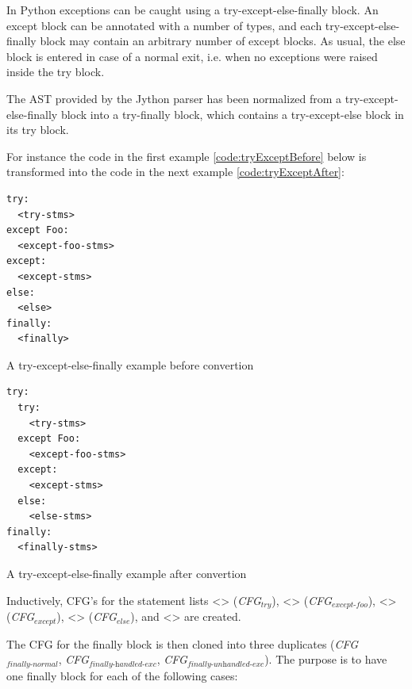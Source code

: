 In Python exceptions can be caught using a try-except-else-finally block. An except block can be annotated with a number of types, 
and each try-except-else-finally block may contain an arbitrary number of except blocks. As usual, the else block is entered in case of a normal exit, 
i.e. when no exceptions were raised inside the try block.

The AST provided by the Jython parser has been normalized from a try-except-else-finally block into a try-finally block, 
which contains a try-except-else block in its try block.

For instance the code in the first example \ref{code:tryExceptBefore} below is transformed into the code in the next example \ref{code:tryExceptAfter}:

\begin{listing}[H]
	\begin{verbatim}
try:
  <try-stms>
except Foo:
  <except-foo-stms>
except:
  <except-stms>
else: 
  <else>
finally:
  <finally>
	\end{verbatim}
	\caption{A try-except-else-finally example before convertion}\label{code:tryExceptBefore}
\end{listing}

\begin{listing}[H]
	\begin{verbatim}
try: 
  try:
    <try-stms>
  except Foo:
    <except-foo-stms>
  except:
    <except-stms>
  else:
    <else-stms>
finally:
  <finally-stms>
	\end{verbatim}
	\caption{A try-except-else-finally example after convertion}\label{code:tryExceptAfter}
\end{listing}

\begin{sloppypar}
  Inductively, CFG's for the statement lists <> (\textit{CFG$_{\textit{try}}$}), 
  <> (\textit{CFG$_{\textit{except-foo}}$}), <> (\textit{CFG$_{\textit{except}}$}), 
  <> (\textit{CFG$_{\textit{else}}$}), and <> are created. 
\end{sloppypar}

The CFG for the finally block is then cloned into three duplicates (\textit{CFG$_{\textit{finally-normal}}$}, 
\textit{CFG$_{\textit{finally-handled-exc}}$}, \textit{CFG$_{\textit{finally-unhandled-exc}}$}). The purpose is to have one finally block for each of the following cases: 

